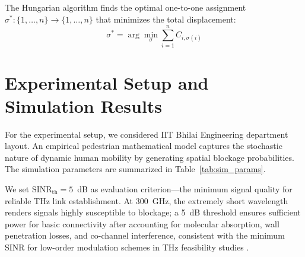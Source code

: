 \documentclass[conference]{IEEEtran}
\begin{document}
	The Hungarian algorithm finds the optimal one-to-one assignment $\sigma^*: \{1, \ldots, n\} \to \{1, \ldots, n\}$ that minimizes the total displacement:
	\begin{equation}
		\sigma^* = \arg\min_{\sigma} \sum_{i=1}^{n} C_{i, \sigma(i)}
		\label{eq:hungarian}
	\end{equation}
	
	
	
	
	
	
	\section{Experimental Setup and Simulation Results}
	
	For the experimental setup, we considered IIT Bhilai Engineering department layout. An empirical pedestrian mathematical model captures the stochastic nature of dynamic human mobility by generating spatial blockage probabilities. The simulation parameters are summarized in Table~\ref{tab:sim_params}.
	
	We set $\text{SINR}_{\text{th}} = 5$~dB as evaluation criterion—the minimum signal quality for reliable THz link establishment. At 300~GHz, the extremely short wavelength renders signals highly susceptible to blockage; a 5~dB threshold ensures sufficient power for basic connectivity after accounting for molecular absorption, wall penetration losses, and co-channel interference, consistent with the minimum SINR for low-order modulation schemes in THz feasibility studies \cite{b5}.
	\renewcommand{\arraystretch}{1.2}
	
\end{document}
